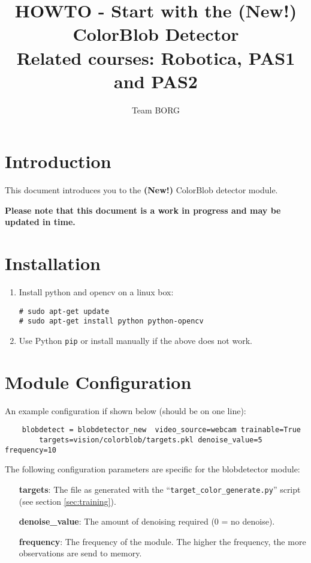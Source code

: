 \documentclass[a4paper, 10pt]{article}
\title{HOWTO - Start with the (New!) ColorBlob Detector \\ \small{Related courses: Robotica, PAS1 and PAS2}}
\author{Team BORG}
\begin{document}
\maketitle

\tableofcontents

\section{Introduction}

This document introduces you to the \textbf{(New!)} ColorBlob detector module.

\textbf{Please note that this document is a work in progress and may be updated in time.}

\section{Installation}

\begin{enumerate}
    \item Install python and opencv on a linux box:
\begin{lstlisting}
# sudo apt-get update
# sudo apt-get install python python-opencv
\end{lstlisting}
    \item Use Python \lstinline{pip} or install manually if the above does not work.
\end{enumerate}

\section{Module Configuration}

An example configuration if shown below (should be on one line):
\begin{lstlisting}
    blobdetect = blobdetector_new  video_source=webcam trainable=True
        targets=vision/colorblob/targets.pkl denoise_value=5 frequency=10
\end{lstlisting}

The following configuration parameters are specific for the blobdetector module:
\begin{enumerate}
    \item[\textbf{targets}:] The file as generated with the ``\lstinline{target_color_generate.py}'' script (see section \ref{sec:training}).
    \item[\textbf{denoise\_value}:] The amount of denoising required (0 = no denoise).
    \item[\textbf{frequency}:] The frequency of the module. The higher the frequency, the more observations are send to memory.
\end{enumerate}
\end{document}
